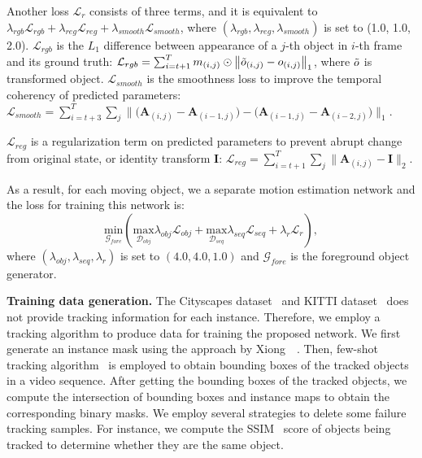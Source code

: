\documentclass[10pt,twocolumn,letterpaper]{article}
\begin{document}
Another loss $\mathcal{L}_r$ consists of three terms, and it is equivalent to $\lambda_{rgb} \mathcal{L}_{rgb} + \lambda_{reg} \mathcal{L}_{reg} + \lambda_{smooth} \mathcal{L}_{smooth}$, where $(\lambda_{rgb}, \lambda_{reg}, \lambda_{smooth})$ is set to (1.0, 1.0, 2.0).
$\mathcal{L}_{rgb}$ is the $L_1$ difference between appearance of a $j$-th object in $i$-th frame and its ground truth: 
$\mathcal{L}_{rgb} = \sum_{i=t+1}^{T} m_{(i,j)} \odot \left \|\Tilde{o}_{(i,j)} - o_{(i,j)} \right \|_1$, where $\Tilde{o}$ is transformed object. 
$\mathcal{L}_{smooth}$ is the smoothness loss to improve the temporal coherency of predicted parameters: $\mathcal{L}_{smooth} = \sum_{i=t+3}^{T}\sum_{j} \|\big(\mathbf{A}_{(i,j)}-\mathbf{A}_{({i-1},j)}\big) - \big(\mathbf{A}_{({i-1},j)}-\mathbf{A}_{({i-2},j)}\big) \|_1$.

$\mathcal{L}_{reg}$ is a regularization term on predicted parameters to prevent abrupt change from original state, or identity transform $\mathbf{I}$:
$\mathcal{L}_{reg} = \sum_{i=t+1}^{T}\sum_{j} \|\mathbf{A}_{(i,j)}-\mathbf{I}\|_2$.

As a result, for each moving object, we a separate motion estimation network and the loss for training this network is:
\begin{equation}
    \underset{\mathcal{G}_{fore}}{\mathrm{min}}(\underset{\mathcal{D}_{obj}}{\mathrm{max}}\lambda_{obj}\mathcal{L}_{obj} + \underset{\mathcal{D}_{seq}}{\mathrm{max}}\lambda_{seq}\mathcal{L}_{seq} + \lambda_{r}\mathcal{L}_r),
\end{equation}
where $(\lambda_{obj}, \lambda_{seq}, \lambda_{r})$ is set to $(4.0, 4.0, 1.0)$ and $\mathcal{G}_{fore}$ is the foreground object generator.

\vspace{2mm}
\noindent\textbf{Training data generation.}
The Cityscapes dataset~\cite{Cordts2016Cityscapes} and KITTI dataset~\cite{kitti} does not provide tracking information for each instance. Therefore, we employ a tracking algorithm to produce data for training the proposed network. We first generate an instance mask using the approach by Xiong~\etal~\cite{xiong19upsnet}. Then, few-shot tracking algorithm~\cite{li2018siamrpn++} is employed to obtain bounding boxes of the tracked objects in a video sequence. After getting the bounding boxes of the tracked objects, we compute the intersection of bounding boxes and instance maps to obtain the corresponding binary masks. We employ several strategies to delete some failure tracking samples. For instance, we compute the SSIM~\cite{ssim} score of objects being tracked to determine whether they are the same object.
\end{document}

